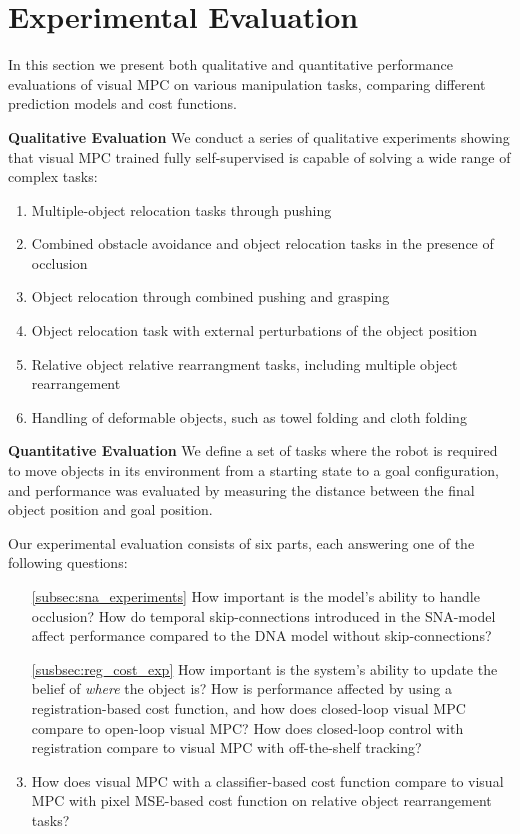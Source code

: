 \section{Experimental Evaluation}
\label{sec:experiments}
In this section we present both qualitative and quantitative  performance evaluations of visual MPC on various manipulation tasks, comparing different prediction models and cost functions.

\textbf{Qualitative Evaluation}
We conduct a series of qualitative experiments showing that visual MPC trained fully self-supervised is capable of solving a wide range of complex tasks:
\begin{enumerate}
	\item Multiple-object relocation tasks through pushing
	\item Combined obstacle avoidance and object relocation tasks in the presence of occlusion
	\item Object relocation through combined pushing and grasping
	\item Object relocation task with external perturbations of the object position
	\item Relative object relative rearrangment tasks, including multiple object rearrangement
	\item Handling of deformable objects, such as towel folding and cloth folding
\end{enumerate}

\textbf{Quantitative Evaluation} We define a set of tasks where the robot is required to move objects in its environment from a starting state to a goal configuration, and performance was evaluated by measuring the distance between the final object position and goal position. 

Our experimental evaluation consists of six parts, each answering one of the following questions:
\begin{enumerate}
	\item [\ref{subsec:sna_experiments}] How important is the model's ability to handle occlusion? How do temporal skip-connections introduced in the SNA-model affect performance compared to the DNA model without skip-connections?
	\item [\ref{susbsec:reg_cost_exp}] How important is the system's ability to update the belief of \emph{where} the object is? How is performance affected by using a registration-based cost function, and how does closed-loop visual MPC compare to open-loop visual MPC?  How does closed-loop control with registration compare to visual MPC with off-the-shelf tracking?
	\item How does visual MPC with a classifier-based cost function compare to visual MPC with pixel MSE-based cost function on relative object rearrangement tasks?
\end{enumerate}

